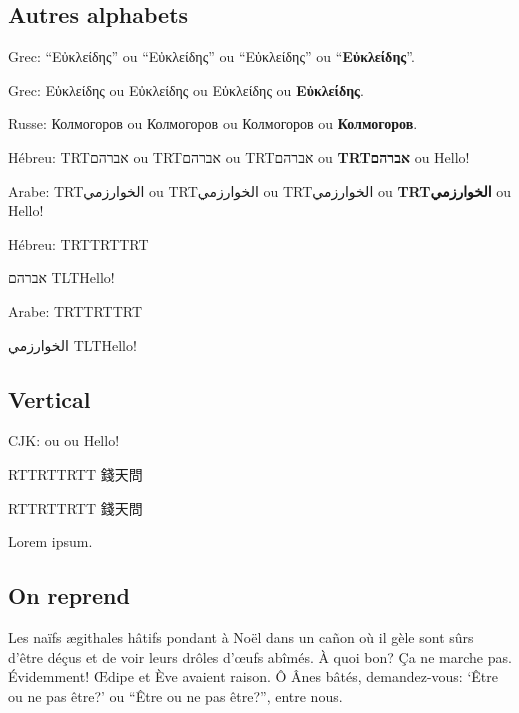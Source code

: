 \documentclass[a4paper,twoside,10pt,english,french]{article}   %
\newcommand*{\textHebrew}[1]{\begingroup\textdir TRT#1\endgroup}
\newcommand*{\textArabic}[1]{\begingroup\textdir TRT#1\endgroup}
\newenvironment{Hebrew}{\textdir TRT\pardir TRT\bodydir TRT}{}
\newenvironment{Arabic}{\textdir TRT\pardir TRT\bodydir TRT}{}
\renewcommand*{\textHebrew}[1]{\begingroup\Hebrfont\textdir TRT#1\endgroup}
\renewenvironment{Hebrew}{\Hebrfont\textdir TRT\pardir TRT\bodydir TRT}{}
\renewcommand*{\textArabic}[1]{\begingroup\Arabfont\textdir TRT#1\endgroup}
\renewenvironment{Arabic}{\Arabfont\textdir TRT\pardir TRT\bodydir TRT}{}
\renewcommand*{\textArabic}[1]{\begingroup\Arabfont\textdir TRT#1\endgroup}
\renewenvironment{Arabic}{\Arabfont\textdir TRT\pardir TRT\bodydir TRT}{}
\renewcommand*{\textArabic}[1]{\begingroup\rmfamily\textdir TRT#1\endgroup}
\renewenvironment{Arabic}{\rmfamily\textdir TRT\pardir TRT\bodydir TRT}{}
\renewcommand*{\textHebrew}[1]{\begingroup\sffamily\textdir TRT#1\endgroup}
\renewcommand*{\textArabic}[1]{\begingroup\sffamily\textdir TRT#1\endgroup}
\renewenvironment{Hebrew}{\sffamily\textdir TRT\pardir TRT\bodydir TRT}{}
\renewenvironment{Arabic}{\sffamily\textdir TRT\pardir TRT\bodydir TRT}{}
\newcommand*{\RL}[1]{\begingroup\textdir TRT#1\endgroup}
\newcommand*{\LR}[1]{\begingroup\normalfont\textdir TLT#1\endgroup} %
\newenvironment{RTT}[1][\baselineskip]{\begin{minipage}[t][\baselineskip]{#1}%
  \CJKfont\textdir RTT\pardir RTT\bodydir RTT}{\end{minipage}}   %
\newcommand{\og}{\guillemotleft}
\newcommand{\fg}{\guillemotright\xspace}
\theoremstyle{definition}
\theoremstyle{remark}
\theoremstyle{plain}
\begin{document}
\subsection{Autres alphabets}

Grec: \enquote{\rmfamily Εὐκλείδης} ou \enquote{\sffamily Εὐκλείδης} ou \enquote{Εὐκλείδης} ou \enquote{\bfseries Εὐκλείδης}.%

Grec: \og\textrm{Εὐκλείδης}\fg ou \og\textsf{Εὐκλείδης}\fg ou \og Εὐκλείδης\fg ou \og\textbf{Εὐκλείδης}\fg.

Russe: \og\textrm{Колмогоров}\fg ou \og\textsf{Колмогоров}\fg ou \og Колмогоров\fg ou \og\textbf{Колмогоров}\fg.

Hébreu: \og\textrm{\RL{אברהם}}\fg ou \og\textsf{\RL{אברהם}}\fg ou \og\textHebrew{אברהם}\fg  ou \og\textbf{\textHebrew{אברהם}}\fg ou Hello!

Arabe: \og\textrm{\RL{اﻟﺨﻮارزﻣﻲ}}\fg ou \og\textsf{\RL{اﻟﺨﻮارزﻣﻲ}}\fg ou \og\textArabic{اﻟﺨﻮارزﻣﻲ}\fg ou \og\textbf{\textArabic{اﻟﺨﻮارزﻣﻲ}}\fg ou Hello!

Hébreu:
\begin{Hebrew}

אברהם
\LR{Hello!}
\end{Hebrew}

Arabe:
\begin{Arabic}

اﻟﺨﻮارزﻣﻲ
\LR{Hello!}
\end{Arabic}

\subsection{Vertical}

CJK: \og{}\fg ou \og\textbf{}\fg ou Hello!

\begin{RTT}%
錢天問
\end{RTT}
\begin{RTT}[3em]
錢天問
\end{RTT}
Lorem ipsum.

\subsection{On reprend}

Les naïfs ægithales hâtifs pondant à Noël dans un cañon où il gèle sont sûrs d'être déçus et de voir leurs drôles d'œufs abîmés. À quoi bon? Ça ne marche pas. Évidemment! Œdipe et Ève avaient raison. Ô Ânes bâtés, demandez-vous: \enquote*{Être ou ne pas être?} ou \enquote{Être ou ne pas être?}, entre nous.
\end{document}
